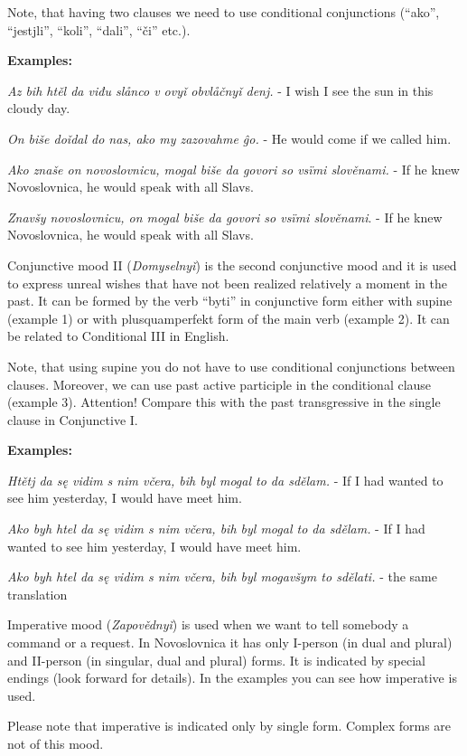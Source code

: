 Note, that having two clauses we need to use conditional conjunctions (“ako”, “jestjli”, “koli”, “dali”, “či” etc.).

\textbf{Examples:}

\textit{Az bih htěl da viđu slånco v ovyǐ obvlåčnyǐ denj.} - I wish I see the sun in this cloudy day.

\textit{On biše doǐdal do nas, ako my zazovahme ĝo.} - He would come if we called him.

\textit{Ako znaše on novoslovnicu, mogal biše da govori so vsïmi slověnami.} - If he knew Novoslovnica, he would speak with all Slavs.

\textit{Znavšy novoslovnicu, on mogal biše da govori so vsïmi slověnami}. - If he knew Novoslovnica, he would speak with all Slavs.

Conjunctive mood II (\textit{Domyselnyǐ}) is the second conjunctive mood and it is used to express unreal wishes that have not been realized relatively a moment in the past. It can be formed by the verb “byti” in conjunctive form either  with supine (example 1) or with plusquamperfekt form of the main verb (example 2). It can be related to Conditional III in English. 

Note, that using supine you do not have to use conditional conjunctions between clauses. Moreover, we can use past active participle in the conditional clause (example 3). Attention! Compare this with the past transgressive in the single clause in Conjunctive I.

\textbf{Examples:}

\textit{Htětj da sę vidim s nim včera, bih byl mogal to da sdělam.} - If  I had wanted to see him yesterday, I would have meet him.

\textit{Ako byh htel da sę vidim s nim včera, bih byl mogal to da sdělam.} - If  I had wanted to see him yesterday, I would have meet him.

\textit{Ako byh htel da sę vidim s nim včera, bih byl mogavšym to sdělati.} - the same translation

Imperative mood (\textit{Zapovědnyǐ})  is used when we want to tell somebody a command or a request. In Novoslovnica it has only I-person (in dual and plural) and II-person (in singular, dual and plural) forms. It is indicated by special endings (look forward for details). In the examples you can see how imperative is used.

Please note that imperative is indicated only by single form. Complex forms are not of this mood.


